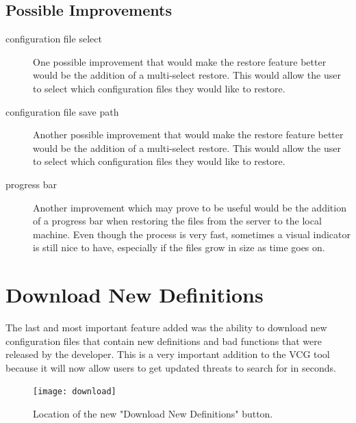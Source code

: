 \documentclass[letterpaper,twocolumn,10pt]{article}
\begin{document}
\subsection{Possible Improvements}
\begin{description}
\item[configuration file select] One possible improvement that would make the restore feature better would be the addition of a multi-select restore. This would allow the user to select which configuration files they would like to restore.
\item[configuration file save path] Another possible improvement that would make the restore feature better would be the addition of a multi-select restore. This would allow the user to select which configuration files they would like to restore.

\item[progress bar] Another improvement which may prove to be useful would be the addition of a progress bar when restoring the files from the server to the local machine. Even though the process is very fast, sometimes a visual indicator is still nice to have, especially if the files grow in size as time goes on.

\end{description}

\section{Download New Definitions}

The last and most important feature added was the ability to download new configuration files that contain new definitions and bad functions that were released by the developer. This is a very important addition to the VCG tool because it will now allow users to get updated threats to search for in seconds. 

\begin{figure}[h]
\centering
\texttt{[image: download]}
\caption{\label{fig:download}Location of the new "Download New Definitions" button.}
\end{figure}






\end{document}
